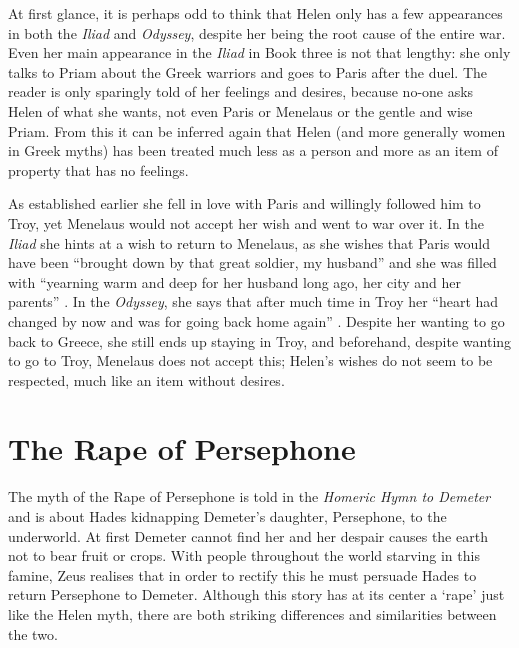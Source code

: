 \documentclass[11pt]{article}
\begin{document}
At first glance, it is perhaps odd to think that Helen only has a few appearances in both the \emph{Iliad} and \emph{Odyssey}, despite her being the root cause of the entire war.
Even her main appearance in the \emph{Iliad} in Book three is not that lengthy: she only talks to Priam about the Greek warriors and goes to Paris after the duel.
The reader is only sparingly told of her feelings and desires, because no-one asks Helen of what she wants, not even Paris or Menelaus or the gentle and wise Priam.
From this it can be inferred again that Helen (and more generally women in Greek myths) has been treated much less as a person and more as an item of property that has no feelings.

As established earlier she fell in love with Paris and willingly followed him to Troy, yet Menelaus would not accept her wish and went to war over it.
In the \emph{Iliad} she hints at a wish to return to Menelaus, as she wishes that Paris would have been ``brought down by that great soldier, my husband'' and she was filled with ``yearning warm and deep for her husband long ago, her city and her parents'' \cite[book 1, line 500/168]{Iliad}.
In the \emph{Odyssey}, she says that after much time in Troy her ``heart had changed by now and was for going back home again'' \cite[book 11, line 260]{Odyssey}.
Despite her wanting to go back to Greece, she still ends up staying in Troy, and beforehand, despite wanting to go to Troy, Menelaus does not accept this; Helen's wishes do not seem to be respected, much like an item without desires.


\section{The Rape of Persephone}
The myth of the Rape of Persephone is told in the \emph{Homeric Hymn to Demeter} and is about Hades kidnapping Demeter's daughter, Persephone, to the underworld.
At first Demeter cannot find her and her despair causes the earth not to bear fruit or crops.
With people throughout the world starving in this famine, Zeus realises that in order to rectify this he must persuade Hades to return Persephone to Demeter.
Although this story has at its center a `rape' just like the Helen myth, there are both striking differences and similarities between the two.
\end{document}
